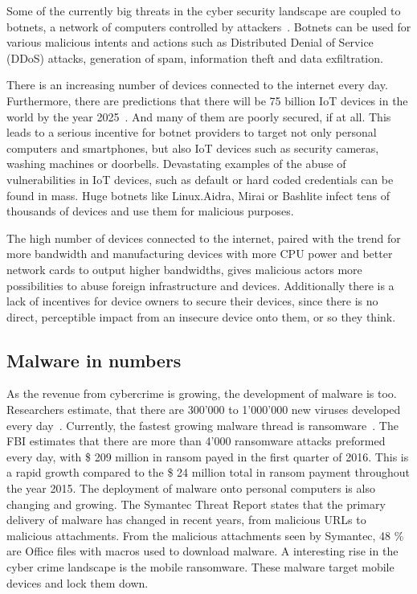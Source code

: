 Some of the currently big threats in the cyber security landscape are coupled to botnets, a network of computers controlled by attackers~\cite{Putman}.
Botnets can be used for various malicious intents and actions such as Distributed Denial of Service (DDoS) attacks, generation of spam, information theft and data exfiltration.

There is an increasing number of devices connected to the internet every day.
Furthermore, there are predictions that there will be 75 billion IoT devices in the world by the year 2025~\cite{Statista}.
And many of them are poorly secured, if at all.
This leads to a serious incentive for botnet providers to target not only personal computers and smartphones, but also IoT devices such as security cameras, washing machines or doorbells.
Devastating examples of the abuse of vulnerabilities in IoT devices, such as default or hard coded credentials can be found in mass.
Huge botnets like Linux.Aidra, Mirai or Bashlite infect tens of thousands of devices and use them for malicious purposes.

The high number of devices connected to the internet, paired with the trend for more bandwidth and manufacturing devices with more CPU power and better network cards to output higher bandwidths, gives malicious actors more possibilities to abuse foreign infrastructure and devices.
Additionally there is a lack of incentives for device owners to secure their devices, since there is no direct, perceptible impact from an insecure device onto them, or so they think.

\subsection{Malware in numbers}
As the revenue from cybercrime is growing, the development of malware is too.
Researchers estimate, that there are 300'000 to 1'000'000 new viruses developed every day~\cite{McAfee18}.
Currently, the fastest growing malware thread is ransomware~\cite{McAfee18}.
The FBI estimates that there are more than 4'000 ransomware attacks preformed every day, with \$ 209 million in ransom payed in the first quarter of 2016.
This is a rapid growth compared to the \$ 24 million total in ransom payment throughout the year 2015.
The deployment of malware onto personal computers is also changing and growing.
The Symantec Threat Report states that the primary delivery of malware has changed in recent years, from malicious URLs to malicious attachments.
From the malicious attachments seen by Symantec, 48 \% are Office files with macros used to download malware.
A interesting rise in the cyber crime landscape is the mobile ransomware.
These malware target mobile devices and lock them down.\cite{Symantec19}

